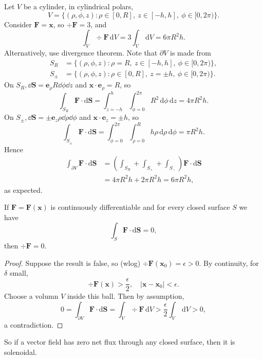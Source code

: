 \begin{example}
    Let $V$ be a cylinder, in cylindrical polars, 
    \[
        V = \{(\rho,\phi,z): \rho\in [0,R],\ z\in [-h,h],\ \phi\in [0,2\pi)\}.
    \]
    Consider $ \mathbf{F} = \mathbf{x} $, so $ \div\mathbf{F} = 3 $, and 
    \[
        \int_{V} \div\mathbf{F} \,\mathrm{d}V = 3 \int_{V} \,\mathrm{d}V = 6 \pi R^2 h.
    \]
    Alternatively, use divergence theorem. Note that $ \partial V $ is made from 
    \begin{align*}
        S_R &= \{(\rho,\phi,z): \rho=R,\ z\in [-h,h],\ \phi\in [0,2\pi)\},\\ 
        S_{\pm} &= \{(\rho,\phi,z): \rho\in [0,R],\ z=\pm h,\ \phi\in [0,2\pi)\}.
    \end{align*}
    On $ S_R, \dd \mathbf{S} = \mathbf{e}_\rho R \dd \phi\dd z $ and $ \mathbf{x} \cdot \mathbf{e}_\rho=R $, so
    \[
        \int_{S_R} \mathbf{F} \cdot\mathrm{d}\mathbf{S} = \int_{z=-h}^{h} \int_{\phi=0}^{2\pi} R^2 \,\mathrm{d}\phi \,\mathrm{d}z = 4\pi R^2 h.
    \]
    On $ S_{\pm}, \dd \mathbf{S} = \pm \mathbf{e}_z \rho\dd \rho\dd \phi $ and $ \mathbf{x} \cdot \mathbf{e}_z = \pm h $, so 
    \[ 
        \int_{S_\pm} \mathbf{F} \cdot\mathrm{d}\mathbf{S} = \int_{\phi=0}^{2\pi} \int_{\rho=0}^{R} h\rho \,\mathrm{d}\rho \,\mathrm{d}\phi = \pi R^2 h.
    \]
    Hence 
    \begin{align*} 
        \int_{\partial V} \mathbf{F} \cdot\mathrm{d}\mathbf{S} &= \left( \int_{S_R}+\int_{S_+}+\int_{S_-} \right) \mathbf{F}\cdot\mathrm{d}\mathbf{S}\\ 
        &= 4\pi R^2 h+ 2 \pi R^2 h = 6\pi R^2 h,
    \end{align*}
    as expected.
\end{example}

\begin{proposition}
    If $ \mathbf{F} = \mathbf{F}(\mathbf{x}) $ is continuously differentiable and for every closed surface $S$ we have 
    \[
        \int_{S}  \mathbf{F}\cdot \mathrm{d}\mathbf{S} = 0,
    \]
    then $ \div\mathbf{F}= 0 $.
\end{proposition}
\begin{proof}
    Suppose the result is false, so (wlog) $ \div\mathbf{F}(\mathbf{x}_0)=\epsilon>0 $. By continuity, for $ \delta $ small, 
    \[
        \div\mathbf{F}(\mathbf{x})>\frac{\epsilon}{2}, \quad |\mathbf{x}-\mathbf{x}_0|<\epsilon.
    \]
    Choose a volumn $V$ inside this ball. Then by assumption,
    \[
        0 = \int_{\partial V} \mathbf{F} \cdot\mathrm{d}\mathbf{S} = \int_{V} \div\mathbf{F} \,\mathrm{d}V > \frac{\epsilon}{2} \int_{V} \,\mathrm{d}V>0,
    \]
    a contradiction.
\end{proof}
So if a vector field has zero net flux through any closed surface, then it is solenoidal.

